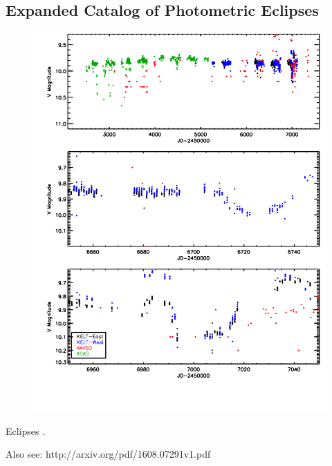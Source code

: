 \documentclass{aastex6}
\begin{document}
\subsection{Expanded Catalog of Photometric Eclipses}


\begin{figure}[htb]
\begin{center}
  \includegraphics[height=0.5\textheight]{KELT_eclipses.pdf}
  \end{center}
\end{figure}

Eclipses \citep{shevchenko92,shevchenko98}.

Also see: http://arxiv.org/pdf/1608.07291v1.pdf
\end{document}

